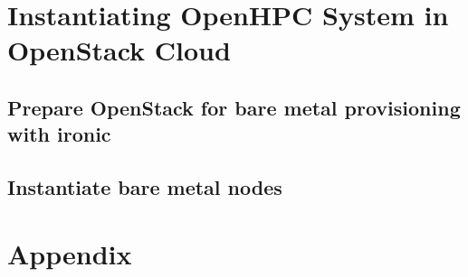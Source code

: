 \documentclass[letterpaper]{article}
\begin{document}





\vspace*{-0.15cm}
\vspace*{-0.50cm}

\clearpage
\section{Instantiating OpenHPC System in OpenStack Cloud}

	
\clearpage
\subsection{Prepare OpenStack for bare metal provisioning with ironic} \label{sec:o-s_prep-ironic}


\vspace*{-0.15cm}
\subsection{Instantiate bare metal nodes} \label{sec:instantiate-bare-metal}


\section{Appendix}


\end{document}
